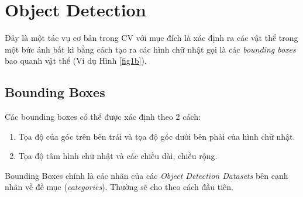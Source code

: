 \documentclass{article}
\begin{document}
\section{Object Detection}
Đây là một tác vụ cơ bản trong CV với mục đích là xác định ra các vật thể trong một bức ảnh bất kì bằng cách tạo ra các hình chữ nhật gọi là các \textit{bounding boxes} bao quanh vật thể (Ví dụ Hình \ref{fig1b}).

\subsection{Bounding Boxes}
Các bounding boxes có thể được xác định theo 2 cách:
\begin{enumerate}
    \item Tọa độ của góc trên bên trái và tọa độ góc dưới bên phải của hình chữ nhật.
    \item Tọa độ tâm hình chữ nhật và các chiều dài, chiều rộng.
\end{enumerate}
Bounding Boxes chính là các nhãn của các \textit{Object Detection Datasets} bên cạnh nhãn về đề mục (\textit{categories}). Thường sẽ cho theo cách đầu tiên.
\end{document}
